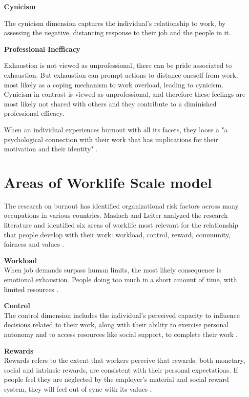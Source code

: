 \textbf{Cynicism}

The cynicism dimension captures the individual's relationship to work, by assessing the negative, distancing response to their job and the people in it.

\textbf{Professional Inefficacy}

Exhaustion is not viewed as unprofessional, there can be pride associated to exhaustion. But exhaustion can prompt actions to distance oneself from work, most likely as a coping mechanism to work overload, leading to cynicism. Cynicism in contrast is viewed as unprofessional, and therefore these feelings are most likely not shared with others and they contribute to a diminished professional efficacy. 

When an individual experiences burnout with all its facets, they loose a "a psychological connection with their work that has implications for their motivation and their identity" \parencite[41]{maslach_understanding_2017}.

\section{Areas of Worklife Scale model}
The research on burnout has identified organizational risk factors across many occupations in various countries. Maslach and Leiter analyzed the research literature and identified six areas of worklife most relevant for the relationship that people develop with their work: workload, control, reward, community, fairness and values \parencite{brom_areas_2015}.

\textbf{Workload}\\
When job demands surpass human limits, the most likely consequence is emotional exhaustion. People doing too much in a short amount of time, with limited resources \parencites{brom_areas_2015}[44]{maslach_understanding_2017}.

\textbf{Control}\\
The control dimension includes the individual's perceived capacity to influence decisions related to their work, along with their ability to exercise personal autonomy and to access resources like social support, to complete their work \parencites{brom_areas_2015}.

\textbf{Rewards}\\
Rewards refers to the extent that workers perceive that rewards; both monetary, social and intrinsic rewards, are consistent with their personal expectations. If people feel they are neglected by the employer's material and social reward system, they will feel out of sync with its values \parencites{brom_areas_2015}.

